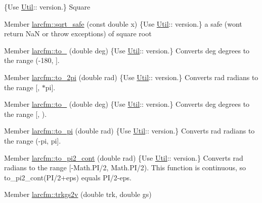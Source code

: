 \begin{DoxyRefList}
\{Use \mbox{\hyperlink{classlarcfm_1_1_util}{Util}}\+:\+: version.\} Square  
\item[Member \mbox{\hyperlink{namespacelarcfm_af284f1acd02d5320f02469b8245b1417}{larcfm\+::sqrt\+\_\+safe}} (const double x)]\label{deprecated__deprecated000027}%
%
\{Use \mbox{\hyperlink{classlarcfm_1_1_util}{Util}}\+:\+: version.\} a safe (won\textquotesingle{}t return NaN or throw exceptions) of square root  
\item[Member \mbox{\hyperlink{namespacelarcfm_a4eafad96fd7f9b4614d8be66a900dbe9}{larcfm\+::to\+\_\+180}} (double deg)]\label{deprecated__deprecated000039}%
%
\{Use \mbox{\hyperlink{classlarcfm_1_1_util}{Util}}\+:\+: version.\} Converts {\ttfamily deg} degrees to the range ({\ttfamily -\/180}, {}\mbox{]}. 
\item[Member \mbox{\hyperlink{namespacelarcfm_a931df59398d98503c2f2b31e335f5b4a}{larcfm\+::to\+\_\+2pi}} (double rad)]\label{deprecated__deprecated000037}%
%
\{Use \mbox{\hyperlink{classlarcfm_1_1_util}{Util}}\+:\+: version.\} Converts {\ttfamily rad} radians to the range \mbox{[}{}, {$\ast$pi}\mbox{]}. 
\item[Member \mbox{\hyperlink{namespacelarcfm_a4b447606c906edec429c257ba9b24e0a}{larcfm\+::to\+\_\+360}} (double deg)]\label{deprecated__deprecated000036}%
%
\{Use \mbox{\hyperlink{classlarcfm_1_1_util}{Util}}\+:\+: version.\} Converts {\ttfamily deg} degrees to the range \mbox{[}{}, {}). 
\item[Member \mbox{\hyperlink{namespacelarcfm_a4294aded9b08415e57cd166fc283da18}{larcfm\+::to\+\_\+pi}} (double rad)]\label{deprecated__deprecated000035}%
%
\{Use \mbox{\hyperlink{classlarcfm_1_1_util}{Util}}\+:\+: version.\} Converts {\ttfamily rad} radians to the range (-\/{\ttfamily pi}, {\ttfamily pi}\mbox{]}. 
\item[Member \mbox{\hyperlink{namespacelarcfm_ae51d5e52ff4f07e51cff18b8bac63ce4}{larcfm\+::to\+\_\+pi2\+\_\+cont}} (double rad)]\label{deprecated__deprecated000038}%
%
\{Use \mbox{\hyperlink{classlarcfm_1_1_util}{Util}}\+:\+: version.\} Converts {\ttfamily rad} radians to the range \mbox{[}{\ttfamily -\/\+Math.\+PI/2}, {\ttfamily Math.\+PI/2}). This function is continuous, so to\+\_\+pi2\+\_\+cont(PI/2+eps) equals PI/2-\/eps. 
\item[Member \mbox{\hyperlink{namespacelarcfm_af24a93e54071ec0e728bc207c0265fe2}{larcfm\+::trkgs2v}} (double trk, double gs)]\label{deprecated__deprecated000042}%

\end{DoxyRefList}
